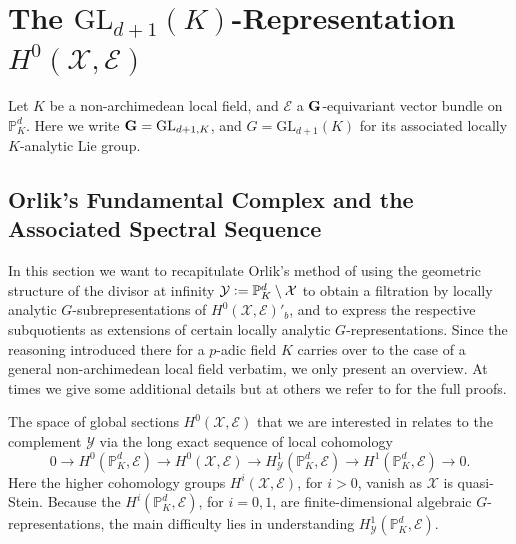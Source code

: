 \documentclass[a4paper, reqno, 10pt]{amsart}
\theoremstyle{definition}
\numberwithin{equation}{section}
\newcommand{\defeq}{\vcentcolon=}
\newcommand{\GL}{{\mathrm{GL}}}
\newcommand{\lra}{\longrightarrow}
\newcommand{\BP}{{\mathbb {P}}}
\newcommand{\CE}{{\mathcal {E}}}
\newcommand{\CX}{{\mathcal {X}}}
\newcommand{\CY}{{\mathcal {Y}}}
\newcommand{\bG}{{\mathrm{\bf G}}}
\begin{document}
\vspace{3ex}


\renewcommand{\sd}{{r}}
\renewcommand{\rigbun}{{}}
\renewcommand{\algbun}{{\mathrm{alg}}}

\newcommand{\sdd}{{r}}
\newcommand{\adbun}{{}}


\section{The $\GL_{d+1}(K)$-Representation $H^0(\CX,\CE)$}


Let $K$ be a non-archimedean local field, and $\CE$ a $\bG$-equivariant vector bundle on $\BP_K^d$.
Here we write $\bG = \GL_{d+1,K}$, and $G = \GL_{d+1}(K)$ for its associated locally $K$-analytic Lie group.




\subsection{Orlik's Fundamental Complex and the Associated Spectral Sequence}\label{Sect 3 - The Fundamental Complex}

In this section we want to recapitulate Orlik's method \cite{Orlik08EquivVBDrinfeldUpHalfSp} of using the geometric structure of the divisor at infinity $\CY \defeq \BP^d_K \setminus \CX$ to obtain a filtration by locally analytic $G$-subrepresentations of $H^0(\CX,\CE)'_b$, and to express the respective subquotients as extensions of certain locally analytic $G$-representations. 
Since the reasoning introduced there for a $p$-adic field $K$ carries over to the case of a general non-archimedean local field verbatim, we only present an overview.
At times we give some additional details but at others we refer to \cite{Orlik08EquivVBDrinfeldUpHalfSp} for the full proofs. 


The space of global sections $H^0(\CX,\CE)$ that we are interested in relates to the complement $\CY$ via the long exact sequence of local cohomology
\begin{equation}\label{Eq 3 - Long exact sequence of local cohomology for complement of DHS}
	0	\lra H^0(\BP_K^d,\CE) \lra H^0 (\CX,\CE) \lra H^1_\CY (\BP^d_K,\CE)  
	\lra H^1 (\BP_K^d,\CE) \lra 0 .
\end{equation}
Here the higher cohomology groups $H^i(\CX,\CE)$, for $i>0$, vanish as $\CX$ is quasi-Stein.
Because the $H^i(\BP_K^d,\CE)$, for $i=0,1$, are finite-dimensional algebraic $G$-representations, the main difficulty lies in understanding $H^1_\CY (\BP^d_K, \CE)$.
\end{document}
